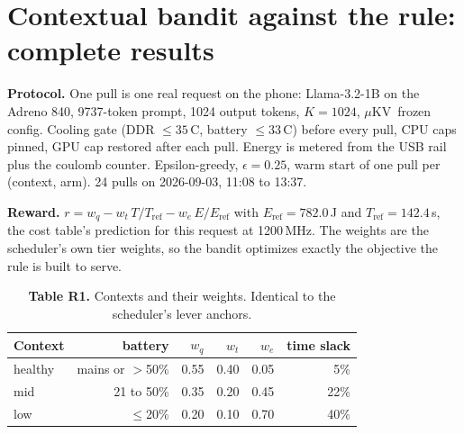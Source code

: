 \documentclass[10pt]{article}
\newcommand{\muKV}{$\mu$KV}
\begin{document}
\section*{Contextual bandit against the rule: complete results}

\noindent\textbf{Protocol.} One pull is one real request on the phone: Llama-3.2-1B on the Adreno 840,
9737-token prompt, 1024 output tokens, $K{=}1024$, \muKV\ frozen config. Cooling gate (DDR $\le35$\,\textdegree C,
battery $\le33$\,\textdegree C) before every pull, CPU caps pinned, GPU cap restored after each pull.
Energy is metered from the USB rail plus the coulomb counter. Epsilon-greedy, $\epsilon=0.25$, warm start of
one pull per (context, arm). 24 pulls on 2026-09-03, 11:08 to 13:37.

\medskip
\noindent\textbf{Reward.} $r = w_q - w_t\,T/T_\mathrm{ref} - w_e\,E/E_\mathrm{ref}$ with
$E_\mathrm{ref}=782.0$\,J and $T_\mathrm{ref}=142.4$\,s, the cost table's prediction for this request at
1200\,MHz. The weights are the scheduler's own tier weights, so the bandit optimizes exactly the objective
the rule is built to serve.

\begin{table}[h]\centering\small
\caption*{\textbf{Table R1.} Contexts and their weights. Identical to the scheduler's lever anchors.}
\begin{tabular}{l r r r r r}
\toprule
\textbf{Context} & \textbf{battery} & $w_q$ & $w_t$ & $w_e$ & \textbf{time slack} \\
\midrule
healthy & mains or $>$50\% & 0.55 & 0.40 & 0.05 & 5\% \\
mid     & 21 to 50\%       & 0.35 & 0.20 & 0.45 & 22\% \\
low     & $\le$20\%        & 0.20 & 0.10 & 0.70 & 40\% \\
\bottomrule
\end{tabular}
\end{table}
\end{document}
